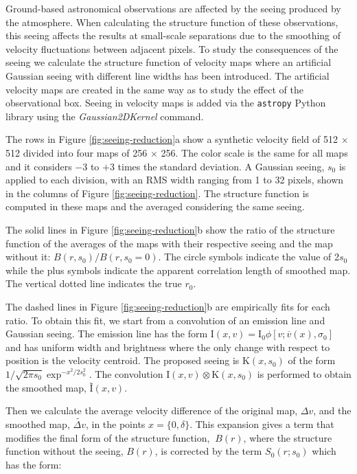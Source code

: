 \documentclass[fleqn,usenatbib, useAMS, a4paper]{mnras}
\begin{document}
Ground-based astronomical observations are affected by the seeing produced by the atmosphere.
When calculating the structure function of these observations, this seeing affects the results at small-scale separations due to the smoothing of velocity fluctuations between adjacent pixels.
To study the consequences of the seeing we calculate the structure function of velocity maps where an artificial Gaussian seeing with different line widths has been introduced.
The artificial velocity maps are created in the same way as to study the effect of the observational box.
Seeing in velocity maps is added via the \texttt{astropy} Python library \citep{astropy:2013} using the \textit{Gaussian2DKernel} command. 

The rows in Figure \ref{fig:seeing-reduction}a show a synthetic velocity field of 512 \(\times\) 512 divided into four maps of 256 \(\times \) 256.
The color scale is the same for all maps and it considers \(- 3\) to \(+ 3\) times the standard deviation.
A Gaussian seeing, \(s_0 \) is applied to each division, with an RMS width ranging from 1 to 32 pixels, shown in the columns of Figure \ref{fig:seeing-reduction}. 
The structure function is computed in these maps and the averaged considering the same seeing. 

The solid lines in Figure \ref{fig:seeing-reduction}b  show the ratio of the structure function of the averages of the maps with their respective seeing and the map without it: \(B (r, s_0 ) / B (r, s_0 = 0) \).
The circle symbols indicate the value of 2\(s_0\) while the plus symbols indicate the apparent correlation length of smoothed map.
The vertical dotted line indicates the true \(r_ {0} \). 

The dashed lines in Figure \ref{fig:seeing-reduction}b are  empirically fits for each ratio.
To obtain this fit, we start from a convolution of an emission line and Gaussian seeing.
The emission line has the form \(\text {I}(x, v) = \text{I}_0 \phi [v; \overline {v} (x), \sigma_0]\) and has uniform width and brightness where the only change with respect to position is the velocity centroid.
The proposed seeing is \(\text{K}(x, s_0)\) of the form \(1 / \sqrt{2 \pi s_0} \exp^ {-x^ 2 / 2s_0 ^ 2} \).
The convolution \(\text{I}(x, v) \otimes \text{K}(x, s_0) \) is performed to obtain the smoothed map, \(\text {\~I} (x, v) \). 

Then we calculate the average velocity difference of the original map, \(\Delta v \), and the smoothed map, \(\tilde{\Delta v}\), in the points \( x = \{0, \delta \} \).
This expansion gives a term that modifies the final form of the structure function, \(~B (r)\), where the structure function without the seeing, \(B(r) \), is corrected by the term \(S_0(r; s_0)\) which has the form: 
\end{document}

